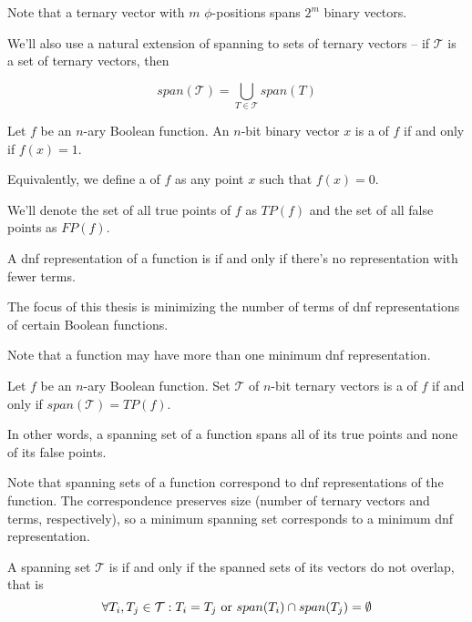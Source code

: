 Note that a ternary vector
with $m$ $\phi$-positions
spans $2^m$ binary vectors.

We'll also use a natural extension of spanning
to sets of ternary vectors --
if $\mathcal{T}$ is a set of ternary vectors, then

\begin{equation*}
span(\mathcal{T}) =
\bigcup_{T \in \mathcal{T}} span(T)
\end{equation*}

\begin{definition}
Let $f$ be an $n$-ary Boolean function.
An $n$-bit binary vector $x$ is a 
of $f$ if and only if $f(x)  = 1$.
\end{definition}

Equivalently,
we define a  of $f$
as any point $x$
such that $f(x) = 0$.

We'll denote the set of all true points of $f$ as $TP(f)$
and the set of all false points as $FP(f)$.

\begin{definition}
A \acrshort{dnf} representation of a function is
if and only if
there's no representation with fewer terms.
\end{definition}

The focus of this thesis is
minimizing the number of terms
of \acrshort{dnf} representations
of certain Boolean functions.

Note that a function may have more than one minimum
\acrshort{dnf} representation.

\begin{definition}
Let $f$ be an $n$-ary Boolean function.
Set $\mathcal{T}$ of $n$-bit ternary vectors
is a  of $f$
if and only if
$span(\mathcal{T}) = TP(f)$.
\end{definition}

In other words,
a spanning set of a function
spans all of its true points
and none of its false points.

Note that spanning sets of a function
correspond to \acrshort{dnf} representations
of the function.
The correspondence preserves size
(number of ternary vectors and terms, respectively),
so a minimum spanning set
corresponds to a minimum \acrshort{dnf} representation.

\begin{definition}
A spanning set $\mathcal{T}$ is 
if and only if the spanned sets of its vectors
do not overlap,
that is
\[
\forall T_i, T_j \in \mathcal{T} : T_i = T_j \text{ or }
span(T_i) \cap span(T_j) = \emptyset
\]
\end{definition}

